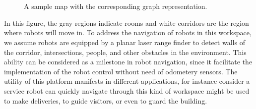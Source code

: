 \documentclass[letterpaper, 10 pt, conference]{ieeeconf}  %
\begin{document}
\begin{figure}[h]
\centering
	 \\
     \\
    \caption{A sample map with the corresponding graph representation.}
    \label{fig:samplemap}
\end{figure}

In this figure, the gray regions indicate rooms and white corridors are the region where robots will move in. To address the navigation of robots in this workspace, we assume robots are equipped by a planar laser range finder to detect walls of the corridor, intersections, people, and other obstacles in the environment. This ability can be considered as a milestone in robot navigation, since it facilitate the implementation of the robot control without need of odometery sensors.
%
The utility of this platform manifests in different applications, for instance consider a service robot can quickly navigate through this kind of workspace might be used to make deliveries, to guide visitors, or even to guard the building.
\end{document}
